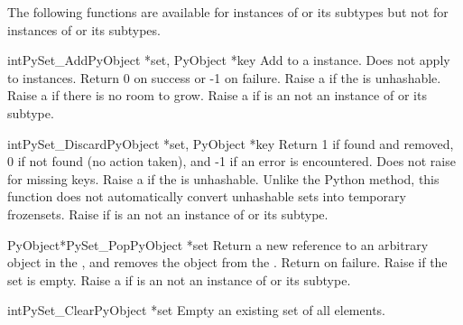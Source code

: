The following functions are available for instances of  or
its subtypes but not for instances of  or its subtypes.

\begin{cfuncdesc}{int}{PySet_Add}{PyObject *set, PyObject *key}
  Add  to a  instance.  Does not apply to
   instances.  Return 0 on success or -1 on failure.
  Raise a  if the  is unhashable.
  Raise a  if there is no room to grow.
  Raise a  if  is an not an instance
  of  or its subtype.
\end{cfuncdesc}

\begin{cfuncdesc}{int}{PySet_Discard}{PyObject *set, PyObject *key}
  Return 1 if found and removed, 0 if not found (no action taken),
  and -1 if an error is encountered.  Does not raise 
  for missing keys.  Raise a  if the  is
  unhashable.  Unlike the Python  method, this function
  does not automatically convert unhashable sets into temporary frozensets.
  Raise  if  is an not an instance
  of  or its subtype.
\end{cfuncdesc}

\begin{cfuncdesc}{PyObject*}{PySet_Pop}{PyObject *set}
  Return a new reference to an arbitrary object in the ,
  and removes the object from the .  Return \NULL{} on
  failure.  Raise  if the set is empty.
  Raise a  if  is an not an instance
  of  or its subtype.
\end{cfuncdesc}

\begin{cfuncdesc}{int}{PySet_Clear}{PyObject *set}
  Empty an existing set of all elements.
\end{cfuncdesc}
